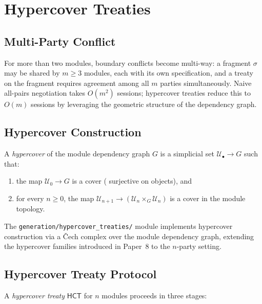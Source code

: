 \documentclass[11pt]{article}
\newcommand{\HCTrt}{\mathsf{HCT}}         %
\begin{document}
\section{Hypercover Treaties}\label{sec:hypercover}

\subsection{Multi-Party Conflict}

For more than two modules, boundary conflicts become multi-way: a
fragment $\sigma$ may be shared by $m \geq 3$ modules, each with its
own specification, and a treaty on the fragment requires agreement
among all $m$ parties simultaneously.  Naive all-pairs negotiation
takes $O(m^2)$ sessions; hypercover treaties reduce this to $O(m)$
sessions by leveraging the geometric structure of the dependency graph.

\subsection{Hypercover Construction}

\begin{definition}\label{def:hypercover}
A \emph{hypercover} of the module dependency graph $G$ is a
simplicial set $\mathcal{U}_\bullet \to G$ such that:
\begin{enumerate}[noitemsep,label=(\roman*)]
  \item the map $\mathcal{U}_0 \to G$ is a cover
    (\ie{} surjective on objects), and
  \item for every $n \geq 0$, the map
    $\mathcal{U}_{n+1} \to (\mathcal{U}_n \times_G \mathcal{U}_n)$
    is a cover in the module topology.
\end{enumerate}
\end{definition}

The \texttt{generation/hypercover\_treaties/} module implements
hypercover construction via a \v{C}ech complex over the module
dependency graph, extending the hypercover families introduced in
Paper~8 to the $n$-party setting.

\subsection{Hypercover Treaty Protocol}

A \emph{hypercover treaty} $\HCTrt$ for $n$ modules proceeds in three
stages:
\end{document}
